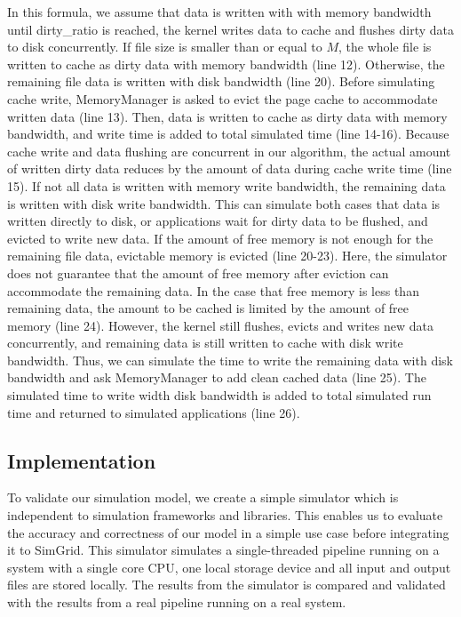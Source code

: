\documentclass[conference]{IEEEtran}
\begin{document}
			In this formula, we assume that data is written with with memory 
			bandwidth until dirty\_ratio is reached, the kernel writes data 
			to cache and flushes dirty data to disk concurrently. 
			If file size is smaller than or equal to $M$, the whole file is 
			written to cache as dirty data with memory bandwidth (line 12). 
			Otherwise, the remaining file data is written with disk bandwidth (line 20). 
			Before simulating cache write, MemoryManager is asked to evict 
			the page cache to accommodate written data (line 13). 
			Then, data is written to cache as dirty data with memory 
			bandwidth, and write time is added to total simulated time (line 14-16). 
			Because cache write and data flushing are concurrent in our algorithm, 
			the actual amount of written dirty data reduces by the amount 
			of data during cache write time (line 15). 
			If not all data is written with memory write bandwidth, the remaining data 
			is written with disk write bandwidth. This can simulate both cases that 
			data is written directly to disk, or applications wait for dirty data 
			to be flushed, and evicted to write new data. 
			If the amount of free memory is not enough for the remaining file data, 
			evictable memory is evicted (line 20-23). 
			Here, the simulator does not guarantee that the amount of free memory 
			after eviction can accommodate the remaining data. 
			In the case that free memory is less than remaining data, the amount to be 
			cached is limited by the amount of free memory (line 24). 
			However, the kernel still flushes, evicts and writes new data concurrently, 
			and remaining data is still written to cache with disk write bandwidth.
			Thus, we can simulate the time to write the remaining data with 
			disk bandwidth and ask MemoryManager to add clean cached data (line 25). 
			The simulated time to write width disk bandwidth is added to total 
			simulated run time and returned to simulated applications (line 26).	
			
		\subsection{Implementation}

			To validate our simulation model, we create a simple 
			simulator which is independent to simulation frameworks and libraries. 
			This enables us to evaluate the accuracy and correctness of our 
			model in a simple use case before integrating it to SimGrid. 
			This simulator simulates a single-threaded pipeline running on a system 
			with a single core CPU, one local storage device and all input and 
			output files are stored locally. The results from the simulator is compared 
			and validated with the results from a real pipeline running on
			a real system.
			
\end{document}
